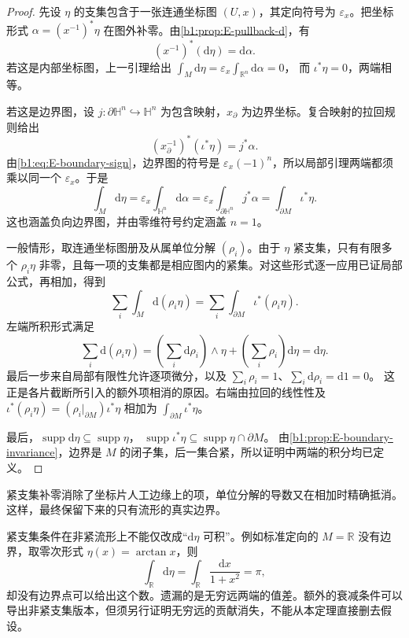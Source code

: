 \begin{proof}
先设 \(\eta\) 的支集包含于一张连通坐标图 \((U,x)\)，其定向符号为 \(\varepsilon_x\)。把坐标形式 \(\alpha=(x^{-1})^*\eta\) 在图外补零。由\cref{b1:prop:E-pullback-d}，有
\[
 (x^{-1})^*(\mathrm d\eta)=\mathrm d\alpha.
\]
若这是内部坐标图，上一引理给出
\(\int_M\mathrm d\eta=\varepsilon_x\int_{\mathbb R^n}\mathrm d\alpha=0\)，
而 \(\iota^*\eta=0\)，两端相等。

若这是边界图，设 \(j:\partial \mathbb H^n\hookrightarrow \mathbb H^n\) 为包含映射，\(x_\partial\) 为边界坐标。复合映射的拉回规则给出
\[
 (x_\partial^{-1})^*(\iota^*\eta)=j^*\alpha.
\]
由\eqref{b1:eq:E-boundary-sign}，边界图的符号是 \(\varepsilon_x(-1)^n\)，所以局部引理两端都须乘以同一个 \(\varepsilon_x\)。于是
\[
 \int_M\mathrm d\eta
  =\varepsilon_x\int_{\mathbb H^n}\mathrm d\alpha
  =\varepsilon_x\int_{\partial \mathbb H^n}j^*\alpha
  =\int_{\partial M}\iota^*\eta.
\]
这也涵盖负向边界图，并由零维符号约定涵盖 \(n=1\)。

一般情形，取连通坐标图册及从属单位分解 \((\rho_i)\)。由于 \(\eta\) 紧支集，只有有限多个 \(\rho_i\eta\) 非零，且每一项的支集都是相应图内的紧集。对这些形式逐一应用已证局部公式，再相加，得到
\[
 \sum_i\int_M\mathrm d(\rho_i\eta)
       =\sum_i\int_{\partial M}\iota^*(\rho_i\eta).
\]
左端所积形式满足
\[
 \sum_i\mathrm d(\rho_i\eta)
  =\left(\sum_i\mathrm d\rho_i\right)\wedge\eta
       +\left(\sum_i\rho_i\right)\mathrm d\eta
  =\mathrm d\eta.
\]
最后一步来自局部有限性允许逐项微分，以及
\(\sum_i\rho_i=1\)、\(\sum_i\mathrm d\rho_i=\mathrm d1=0\)。
这正是各片截断所引入的额外项相消的原因。右端由拉回的线性性及
\(\iota^*(\rho_i\eta)=(\rho_i|_{\partial M})\iota^*\eta\)
相加为 \(\int_{\partial M}\iota^*\eta\)。

最后，\(\operatorname{supp}\mathrm d\eta\subseteq\operatorname{supp}\eta\)，
\(\operatorname{supp}\iota^*\eta\subseteq\operatorname{supp}\eta\cap\partial M\)。
由\cref{b1:prop:E-boundary-invariance}，边界是 \(M\) 的闭子集，后一集合紧，所以证明中两端的积分均已定义。
\end{proof}

紧支集补零消除了坐标片人工边缘上的项，单位分解的导数又在相加时精确抵消。这样，最终保留下来的只有流形的真实边界。

\ProseParagraphBreak

紧支集条件在非紧流形上不能仅改成“\(\mathrm d\eta\) 可积”。例如标准定向的 \(M=\mathbb R\) 没有边界，取零次形式 \(\eta(x)=\arctan x\)，则
\[
 \int_{\mathbb R}\mathrm d\eta
   =\int_{\mathbb R}\frac{\mathrm dx}{1+x^2}=\pi,
\]
却没有边界点可以给出这个数。遗漏的是无穷远两端的值差。额外的衰减条件可以导出非紧支集版本，但须另行证明无穷远的贡献消失，不能从本定理直接删去假设。

